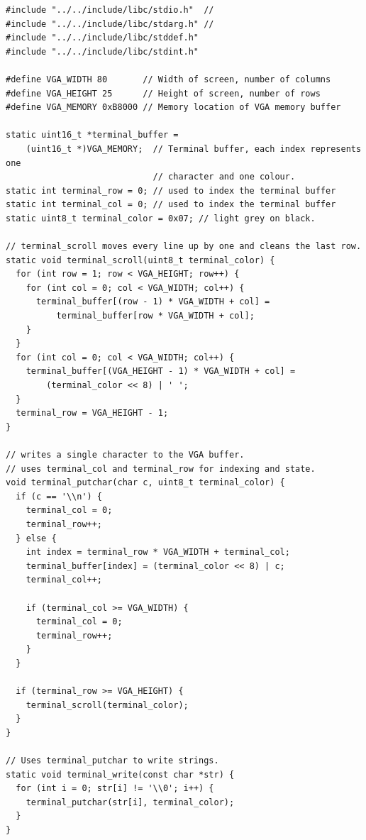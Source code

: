 \documentclass[../main.tex]{subfiles}
\begin{document}
\label{lst:stdio_c}
\begin{verbatim}
#include "../../include/libc/stdio.h"  //
#include "../../include/libc/stdarg.h" //
#include "../../include/libc/stddef.h"
#include "../../include/libc/stdint.h"

#define VGA_WIDTH 80       // Width of screen, number of columns
#define VGA_HEIGHT 25      // Height of screen, number of rows
#define VGA_MEMORY 0xB8000 // Memory location of VGA memory buffer

static uint16_t *terminal_buffer =
    (uint16_t *)VGA_MEMORY;  // Terminal buffer, each index represents one
                             // character and one colour.
static int terminal_row = 0; // used to index the terminal buffer
static int terminal_col = 0; // used to index the terminal buffer
static uint8_t terminal_color = 0x07; // light grey on black.

// terminal_scroll moves every line up by one and cleans the last row.
static void terminal_scroll(uint8_t terminal_color) {
  for (int row = 1; row < VGA_HEIGHT; row++) {
    for (int col = 0; col < VGA_WIDTH; col++) {
      terminal_buffer[(row - 1) * VGA_WIDTH + col] =
          terminal_buffer[row * VGA_WIDTH + col];
    }
  }
  for (int col = 0; col < VGA_WIDTH; col++) {
    terminal_buffer[(VGA_HEIGHT - 1) * VGA_WIDTH + col] =
        (terminal_color << 8) | ' ';
  }
  terminal_row = VGA_HEIGHT - 1;
}

// writes a single character to the VGA buffer.
// uses terminal_col and terminal_row for indexing and state.
void terminal_putchar(char c, uint8_t terminal_color) {
  if (c == '\\n') {
    terminal_col = 0;
    terminal_row++;
  } else {
    int index = terminal_row * VGA_WIDTH + terminal_col;
    terminal_buffer[index] = (terminal_color << 8) | c;
    terminal_col++;

    if (terminal_col >= VGA_WIDTH) {
      terminal_col = 0;
      terminal_row++;
    }
  }

  if (terminal_row >= VGA_HEIGHT) {
    terminal_scroll(terminal_color);
  }
}

// Uses terminal_putchar to write strings.
static void terminal_write(const char *str) {
  for (int i = 0; str[i] != '\\0'; i++) {
    terminal_putchar(str[i], terminal_color);
  }
}


\end{verbatim}
\end{document}
